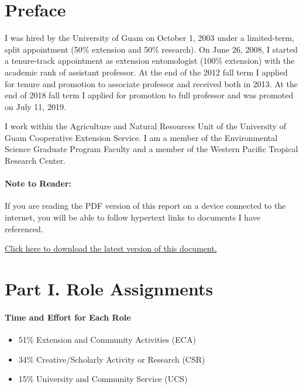 \clearpage


\section{Preface}
	
I was hired by the University of Guam on October 1, 2003 under a limited-term,
split appointment (50\% extension and 50\% research). On June 26,
2008, I started a tenure-track appointment as extension entomologist
(100\% extension) with the academic rank of assistant professor. At
the end of the 2012 fall term I applied for tenure and promotion to associate professor and
received both in 2013. At the end of 2018 fall term I applied for promotion to
full professor and was promoted on July 11, 2019. 

I work within the Agriculture and Natural Resources Unit of the University
of Guam Cooperative Extension Service. I am a member of the
Environmental Science Graduate Program Faculty and a member of the Western
Pacific Tropical Research Center. 

\vspace{0.5in}
\paragraph{Note to Reader:}
If you are reading the PDF version of this report on a device connected
to the internet, you will be able to follow hypertext links to documents
I have referenced.

\href{https://aubreymoore.github.io/CFES2020-22/CFES2020-06-15to2021-06-14.pdf}{Click here to download the latest version of this document.}

\pagebreak

\section{Part I. Role Assignments}
\paragraph{Time and Effort for Each Role}
\begin{itemize}
	\item 51\% Extension and Community Activities (ECA)
	\item 34\% Creative/Scholarly Activity or Research (CSR)
	\item 15\% University and Community Service (UCS)
\end{itemize}


